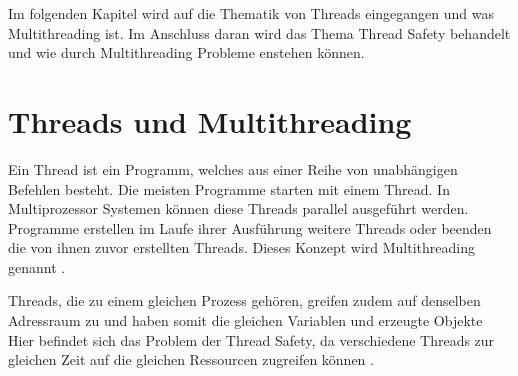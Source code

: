 Im folgenden Kapitel wird auf die Thematik von Threads eingegangen und was Multithreading ist. Im Anschluss daran wird das Thema Thread Safety behandelt und wie durch Multithreading Probleme enstehen können. 

\section{Threads und Multithreading}\label{sec:threads}

Ein Thread ist ein Programm, welches aus einer Reihe von unabhängigen Befehlen besteht. Die meisten Programme starten mit einem Thread. In Multiprozessor Systemen können diese Threads parallel ausgeführt werden. Programme erstellen im Laufe ihrer Ausführung weitere Threads oder beenden die von ihnen zuvor erstellten Threads. Dieses Konzept wird Multithreading genannt \cite[vgl.][70]{banerjee_theory_2006}.

Threads, die zu einem gleichen Prozess gehören, greifen zudem auf denselben Adressraum zu und haben somit die gleichen Variablen und erzeugte Objekte Hier befindet sich das Problem der Thread Safety, da verschiedene Threads zur gleichen Zeit auf die gleichen Ressourcen zugreifen können \cite[vgl.][2]{brian}.